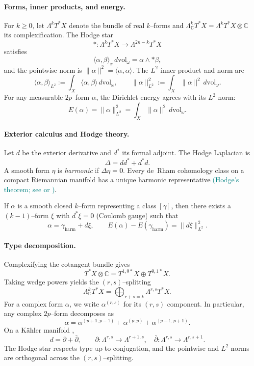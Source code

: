 \documentclass[11pt]{article}
\newcommand{\REVMZ}[1]{\textcolor{teal}{#1}}  %
\numberwithin{equation}{section}  %
\theoremstyle{plain}
\theoremstyle{definition}
\theoremstyle{remark}
\newcommand{\C}{\mathbb{C}}
\newcommand{\harm}{\mathrm{harm}}
\newcommand{\gharm}{\gamma_{\harm}}
\begin{document}
\paragraph{Forms, inner products, and energy.}
For $k\ge0$, let $\Lambda^{k}T^{*}X$ denote the bundle of real $k$--forms and
$\Lambda_{\C}^{k}T^{*}X=\Lambda^{k}T^{*}X\otimes\C$ its complexification.
The Hodge star \REVMZ{\cite{GH78,Wells}}
\[
*:\Lambda^{k}T^{*}X\longrightarrow\Lambda^{2n-k}T^{*}X
\]
satisfies
\[
\langle \alpha,\beta\rangle_{x}\,d\mathrm{vol}_\omega
=
\alpha\wedge *\beta,
\]
and the pointwise norm is $\|\alpha\|^{2}=\langle \alpha,\alpha\rangle$.
The $L^{2}$ inner product and norm are
\[
\langle \alpha,\beta\rangle_{L^{2}}
:=
\int_{X}\langle \alpha,\beta\rangle\,d\mathrm{vol}_\omega,
\qquad
\|\alpha\|^{2}_{L^{2}}
:=
\int_{X}\|\alpha\|^{2}\,d\mathrm{vol}_\omega.
\]
For any measurable $2p$--form $\alpha$, the Dirichlet energy agrees with its
$L^{2}$ norm:
\[
E(\alpha)
=
\|\alpha\|^{2}_{L^{2}}
=
\int_{X}\|\alpha\|^{2}\,d\mathrm{vol}_\omega.
\]

\paragraph{Exterior calculus and Hodge theory.}
Let $d$ be the exterior derivative and $d^{*}$ its formal adjoint.
The Hodge Laplacian is
\[
\Delta = dd^{*}+d^{*}d.
\]
A smooth form $\eta$ is \emph{harmonic} if $\Delta\eta=0$.
Every de~Rham cohomology class on a compact Riemannian manifold has a unique
harmonic representative \REVMZ{(Hodge's theorem; see \cite[Ch.~6]{Wells} or \cite[Thm~5.23]{Voisin02})}.

If $\alpha$ is a smooth closed $k$--form representing a class $[\gamma]$, then
there exists a $(k-1)$--form $\xi$ with $d^{*}\xi=0$ (Coulomb gauge) such that
\[
\alpha=\gharm+d\xi,
\qquad
E(\alpha)-E(\gharm)=\|d\xi\|^{2}_{L^{2}}.
\tag{2}
\]

\paragraph{Type decomposition.}
Complexifying the cotangent bundle gives
\[
T^{*}X\otimes\C
=
T^{1,0*}X\oplus T^{0,1*}X.
\]
Taking wedge powers yields the $(r,s)$--splitting
\[
\Lambda_{\C}^{k}T^{*}X
=
\bigoplus_{r+s=k}\Lambda^{r,s}T^{*}X.
\]
For a complex form $\alpha$, we write $\alpha^{(r,s)}$ for its $(r,s)$
component.  In particular, any complex $2p$--form decomposes as
\[
\alpha
=
\alpha^{(p+1,p-1)}
+
\alpha^{(p,p)}
+
\alpha^{(p-1,p+1)}.
\]
On a K\"ahler manifold \REVMZ{\cite[Ch.~0]{GH78}},
\[
d=\partial+\bar\partial,
\qquad
\partial:\Lambda^{r,s}\to\Lambda^{r+1,s},
\quad
\bar\partial:\Lambda^{r,s}\to\Lambda^{r,s+1}.
\]
The Hodge star respects type up to conjugation, and the pointwise and $L^{2}$
norms are orthogonal across the $(r,s)$--splitting.
\end{document}
